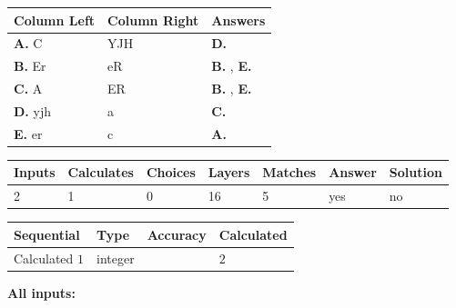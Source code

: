 \documentclass[12pt]{article}
\begin{document}
  
\begin{tabular}{|l|l|l|}
 \hline
 Column Left & Column Right  & Answers       \\ 
 \hline
{\textbf{\large{
A.}}}
C
  & 
YJH
 & 
{\textbf{\large{
D.}}}
 \\ 
 \hline
{\textbf{\large{
B.}}}
Er
  & 
eR
 & 
{\textbf{\large{
B.}}}
, 
{\textbf{\large{
E.}}}
 \\ 
 \hline
{\textbf{\large{
C.}}}
A
  & 
ER
 & 
{\textbf{\large{
B.}}}
, 
{\textbf{\large{
E.}}}
 \\ 
 \hline
{\textbf{\large{
D.}}}
yjh
  & 
a
 & 
{\textbf{\large{
C.}}}
 \\ 
 \hline
{\textbf{\large{
E.}}}
er
  & 
c
 & 
{\textbf{\large{
A.}}}
 \\ 
 \hline
 \end{tabular}
  
  
 
 
\noindent{}
 
 
 
   
   
   
   
\noindent\begin{tabular}{|l|l|l|l|l|l|l|}
 \hline
Inputs & Calculates & Choices & Layers & Matches & Answer & Solution \\ \hline
           2  & 
           1  & 
           0
  & 
          16  & 
           5  & 
  yes & 
  no 
  \\ \hline
 \end{tabular}
   
   
   
   
\noindent{}
   
   
  
  
\noindent\begin{tabular}{|l|l|l|l|}
\hline
 Sequential & Type & Accuracy & Calculated \\ 
\hline
 
 
  Calculated $            1 $ & integer &  & 
  $ 2 $ 
 \\  \hline  
 \end{tabular}
   
   
   
   
\noindent\vspace{0.1in}\hspace{-0.08in} {\textbf{\Large{All inputs: }}}
   
\end{document}
